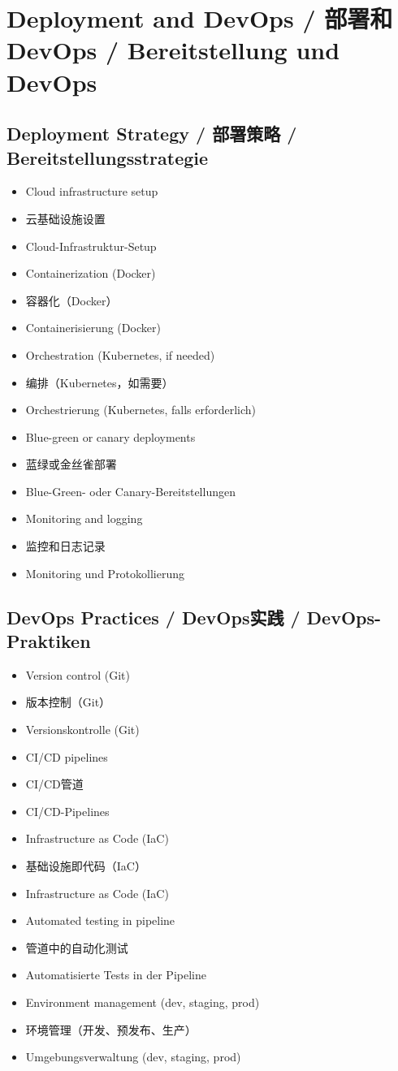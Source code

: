 \section{Deployment and DevOps / 部署和DevOps / Bereitstellung und DevOps}

\subsection{Deployment Strategy / 部署策略 / Bereitstellungsstrategie}
\begin{itemize}
    \item Cloud infrastructure setup
    \item 云基础设施设置
    \item Cloud-Infrastruktur-Setup
    \item Containerization (Docker)
    \item 容器化（Docker）
    \item Containerisierung (Docker)
    \item Orchestration (Kubernetes, if needed)
    \item 编排（Kubernetes，如需要）
    \item Orchestrierung (Kubernetes, falls erforderlich)
    \item Blue-green or canary deployments
    \item 蓝绿或金丝雀部署
    \item Blue-Green- oder Canary-Bereitstellungen
    \item Monitoring and logging
    \item 监控和日志记录
    \item Monitoring und Protokollierung
\end{itemize}

\subsection{DevOps Practices / DevOps实践 / DevOps-Praktiken}
\begin{itemize}
    \item Version control (Git)
    \item 版本控制（Git）
    \item Versionskontrolle (Git)
    \item CI/CD pipelines
    \item CI/CD管道
    \item CI/CD-Pipelines
    \item Infrastructure as Code (IaC)
    \item 基础设施即代码（IaC）
    \item Infrastructure as Code (IaC)
    \item Automated testing in pipeline
    \item 管道中的自动化测试
    \item Automatisierte Tests in der Pipeline
    \item Environment management (dev, staging, prod)
    \item 环境管理（开发、预发布、生产）
    \item Umgebungsverwaltung (dev, staging, prod)
\end{itemize}

